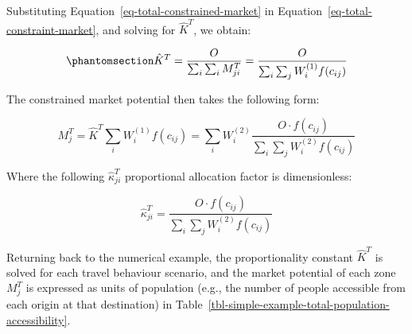 \documentclass[
]{article}
\begin{document}
Substituting Equation~\ref{eq-total-constrained-market} in
Equation~\ref{eq-total-constraint-market}, and solving for \(\hat K^T\),
we obtain:

\begin{equation}\phantomsection\label{eq-total-population-balancing-factor}{
\hat K^T=\frac{O}{\sum_i\sum_i M^T_{ji}} = \frac{O}{\sum_i\sum_j W^{(1)}_i f(c_{ij})} 
}\end{equation}

The constrained market potential then takes the following form:

\[
M^T_j = \hat K^T\sum_i W^{(1)}_if(c_{ij}) = \sum_i W^{(2)}_i \frac{O \cdot f(c_{ij})}{\sum_i\sum_j W^{(2)}_if(c_{ij})}
\]

Where the following \(\hat \kappa_{ji}^T\) proportional allocation
factor is dimensionless:

\[
\hat \kappa_{ji}^T = \frac{O \cdot f(c_{ij})}{\sum_i\sum_j W^{(2)}_if(c_{ij})}
\]

Returning back to the numerical example, the proportionality constant
\(\hat K^T\) is solved for each travel behaviour scenario, and the
market potential of each zone \(M^T_j\) is expressed as units of
population (e.g., the number of people accessible from each origin at
that destination) in
Table~\ref{tbl-simple-example-total-population-accessibility}.
\end{document}
